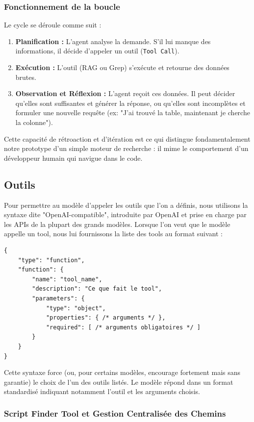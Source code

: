 \subsubsection{Fonctionnement de la boucle}
Le cycle se déroule comme suit :
\begin{enumerate}
    \item \textbf{Planification :} L'agent analyse la demande. S'il lui manque des informations, il décide d'appeler un outil (\texttt{Tool Call}).
    \item \textbf{Exécution :} L'outil (RAG ou Grep) s'exécute et retourne des données brutes.
    \item \textbf{Observation et Réflexion :} L'agent reçoit ces données. Il peut décider qu'elles sont suffisantes et générer la réponse, ou qu'elles sont incomplètes et formuler une nouvelle requête (ex: "J'ai trouvé la table, maintenant je cherche la colonne").
\end{enumerate}

Cette capacité de rétroaction et d'itération est ce qui distingue fondamentalement notre prototype d'un simple moteur de recherche : il mime le comportement d'un développeur humain qui navigue dans le code.

\subsection{Outils}

Pour permettre au modèle d'appeler les outils que l'on a définis, nous utilisons la syntaxe dite "OpenAI-compatible", introduite par OpenAI et prise en charge par les APIs de la plupart des grands modèles. Lorsque l'on veut que le modèle appelle un tool, nous lui fournissons la liste des tools au format suivant :

\begin{verbatim}
{
    "type": "function",
    "function": {
        "name": "tool_name",
        "description": "Ce que fait le tool",
        "parameters": {
            "type": "object",
            "properties": { /* arguments */ },
            "required": [ /* arguments obligatoires */ ]
        }
    }
}
\end{verbatim}

Cette syntaxe force (ou, pour certains modèles, encourage fortement mais sans garantie) le choix de l'un des outils listés. Le modèle répond dans un format standardisé indiquant notamment l'outil et les arguments choisis.

\subsubsection{Script Finder Tool et Gestion Centralisée des Chemins}

